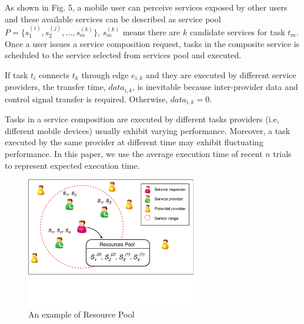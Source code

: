 \documentclass[journal]{IEEEtran}
\begin{document}
As shown in Fig. 5, a mobile user can perceive services exposed by other users and these available services can be described as service pool $P = \{s_1^{(i)}, s_2^{(j)}, ..., s_m^{(k)} \}$, $s_m^{(k)}$ means there are $k$ candidate services for task $t_m$. Once a user issues a service composition request, tasks in the composite service is scheduled to the service selected from services pool and executed. 

If task $t_i$ connects $t_k$ through edge $e_{i,k}$ and they are executed by different service providers, the transfer time, $data_{i,k}$, is inevitable because inter-provider data and control signal transfer is required. Otherwise, $data_{i,k} = 0 $.

Tasks in a service composition are executed by different tasks providers (i.e, different mobile devices) usually exhibit varying performance. Moreover, a task executed by the same provider at different time may exhibit fluctuating performance. In this paper, we use the average execution time of recent $n$ trials to represent expected execution time.

\begin{figure}[!t]
\centering
\includegraphics[width=3in]{./img/pic-extra.pdf}
\caption{An example of Resource Pool}
\label{Resource Pool}
\end{figure}

\end{document}
